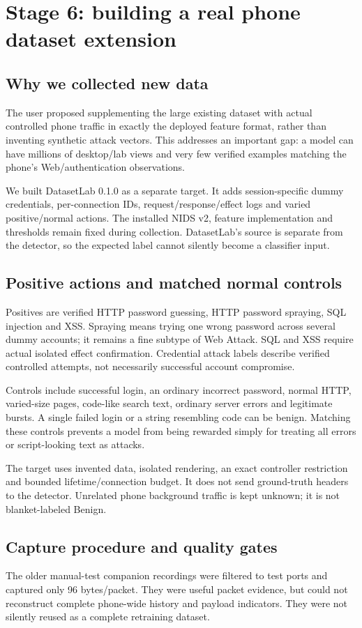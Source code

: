 \documentclass[11pt,a4paper,oneside]{report}
\begin{document}
\chapter{Stage 6: building a real phone dataset extension}
\section{Why we collected new data}
The user proposed supplementing the large existing dataset with actual controlled phone traffic in exactly the deployed feature format, rather than inventing synthetic attack vectors. This addresses an important gap: a model can have millions of desktop/lab views and very few verified examples matching the phone's Web/authentication observations.

We built DatasetLab 0.1.0 as a separate target. It adds session-specific dummy credentials, per-connection IDs, request/response/effect logs and varied positive/normal actions. The installed NIDS v2, feature implementation and thresholds remain fixed during collection. DatasetLab's source is separate from the detector, so the expected label cannot silently become a classifier input.

\section{Positive actions and matched normal controls}
Positives are verified HTTP password guessing, HTTP password spraying, SQL injection and XSS. Spraying means trying one wrong password across several dummy accounts; it remains a fine subtype of Web Attack. SQL and XSS require actual isolated effect confirmation. Credential attack labels describe verified controlled attempts, not necessarily successful account compromise.

Controls include successful login, an ordinary incorrect password, normal HTTP, varied-size pages, code-like search text, ordinary server errors and legitimate bursts. A single failed login or a string resembling code can be benign. Matching these controls prevents a model from being rewarded simply for treating all errors or script-looking text as attacks.

The target uses invented data, isolated rendering, an exact controller restriction and bounded lifetime/connection budget. It does not send ground-truth headers to the detector. Unrelated phone background traffic is kept unknown; it is not blanket-labeled Benign.

\section{Capture procedure and quality gates}
The older manual-test companion recordings were filtered to test ports and captured only 96 bytes/packet. They were useful packet evidence, but could not reconstruct complete phone-wide history and payload indicators. They were not silently reused as a complete retraining dataset.
\end{document}

